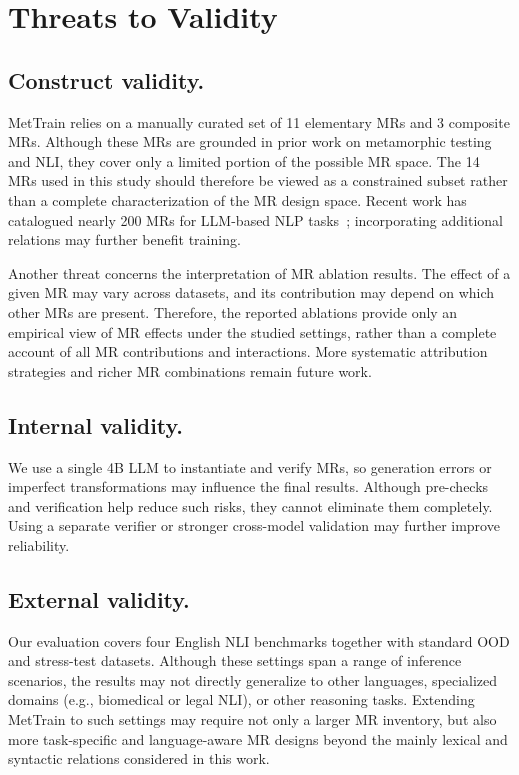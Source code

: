 \documentclass[lettersize,journal]{IEEEtran}
\begin{document}
\section{Threats to Validity}

\subsection{Construct validity.}
MetTrain relies on a manually curated set of 11 elementary MRs and 3 composite MRs. Although these MRs are grounded in prior work on metamorphic testing and NLI, they cover only a limited portion of the possible MR space. The 14 MRs used in this study should therefore be viewed as a constrained subset rather than a complete characterization of the MR design space. Recent work has catalogued nearly 200 MRs for LLM-based NLP tasks~\cite{11185922}; incorporating additional relations may further benefit training.

Another threat concerns the interpretation of MR ablation results. The effect of a given MR may vary across datasets, and its contribution may depend on which other MRs are present. Therefore, the reported ablations provide only an empirical view of MR effects under the studied settings, rather than a complete account of all MR contributions and interactions. More systematic attribution strategies and richer MR combinations remain future work.

\subsection{Internal validity.}
We use a single 4B LLM to instantiate and verify MRs, so generation errors or imperfect transformations may influence the final results. Although pre-checks and verification help reduce such risks, they cannot eliminate them completely. Using a separate verifier or stronger cross-model validation may further improve reliability.


\subsection{External validity.}
Our evaluation covers four English NLI benchmarks together with standard OOD and stress-test datasets. Although these settings span a range of inference scenarios, the results may not directly generalize to other languages, specialized domains (e.g., biomedical or legal NLI), or other reasoning tasks. Extending MetTrain to such settings may require not only a larger MR inventory, but also more task-specific and language-aware MR designs beyond the mainly lexical and syntactic relations considered in this work.
\end{document}
